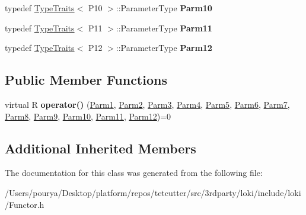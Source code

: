 \begin{DoxyCompactItemize}
\item 
\hypertarget{classLoki_1_1FunctorImpl_3_01R_00_01_01_01_01_01_01_01_01_01_01_01_01_01_01_01_01_01_01_01_01_011f98edb36b5671b9f4e136a08a7d1f1d_af65b1bc2c2b70f61a08b503c8c55f8a4}{}typedef \hyperlink{classLoki_1_1TypeTraits}{Type\+Traits}$<$ P10 $>$\+::Parameter\+Type {\bfseries Parm10}\label{classLoki_1_1FunctorImpl_3_01R_00_01_01_01_01_01_01_01_01_01_01_01_01_01_01_01_01_01_01_01_01_011f98edb36b5671b9f4e136a08a7d1f1d_af65b1bc2c2b70f61a08b503c8c55f8a4}

\item 
\hypertarget{classLoki_1_1FunctorImpl_3_01R_00_01_01_01_01_01_01_01_01_01_01_01_01_01_01_01_01_01_01_01_01_011f98edb36b5671b9f4e136a08a7d1f1d_ae864f67466a74e3e92ac958ff8b3e956}{}typedef \hyperlink{classLoki_1_1TypeTraits}{Type\+Traits}$<$ P11 $>$\+::Parameter\+Type {\bfseries Parm11}\label{classLoki_1_1FunctorImpl_3_01R_00_01_01_01_01_01_01_01_01_01_01_01_01_01_01_01_01_01_01_01_01_011f98edb36b5671b9f4e136a08a7d1f1d_ae864f67466a74e3e92ac958ff8b3e956}

\item 
\hypertarget{classLoki_1_1FunctorImpl_3_01R_00_01_01_01_01_01_01_01_01_01_01_01_01_01_01_01_01_01_01_01_01_011f98edb36b5671b9f4e136a08a7d1f1d_add912ee34bd3723e721b98922337af6e}{}typedef \hyperlink{classLoki_1_1TypeTraits}{Type\+Traits}$<$ P12 $>$\+::Parameter\+Type {\bfseries Parm12}\label{classLoki_1_1FunctorImpl_3_01R_00_01_01_01_01_01_01_01_01_01_01_01_01_01_01_01_01_01_01_01_01_011f98edb36b5671b9f4e136a08a7d1f1d_add912ee34bd3723e721b98922337af6e}

\end{DoxyCompactItemize}
\subsection*{Public Member Functions}
\begin{DoxyCompactItemize}
\item 
\hypertarget{classLoki_1_1FunctorImpl_3_01R_00_01_01_01_01_01_01_01_01_01_01_01_01_01_01_01_01_01_01_01_01_011f98edb36b5671b9f4e136a08a7d1f1d_a3888b8beace4c74d2bf82a4dfd598fc5}{}virtual R {\bfseries operator()} (\hyperlink{classLoki_1_1EmptyType}{Parm1}, \hyperlink{classLoki_1_1EmptyType}{Parm2}, \hyperlink{classLoki_1_1EmptyType}{Parm3}, \hyperlink{classLoki_1_1EmptyType}{Parm4}, \hyperlink{classLoki_1_1EmptyType}{Parm5}, \hyperlink{classLoki_1_1EmptyType}{Parm6}, \hyperlink{classLoki_1_1EmptyType}{Parm7}, \hyperlink{classLoki_1_1EmptyType}{Parm8}, \hyperlink{classLoki_1_1EmptyType}{Parm9}, \hyperlink{classLoki_1_1EmptyType}{Parm10}, \hyperlink{classLoki_1_1EmptyType}{Parm11}, \hyperlink{classLoki_1_1EmptyType}{Parm12})=0\label{classLoki_1_1FunctorImpl_3_01R_00_01_01_01_01_01_01_01_01_01_01_01_01_01_01_01_01_01_01_01_01_011f98edb36b5671b9f4e136a08a7d1f1d_a3888b8beace4c74d2bf82a4dfd598fc5}

\end{DoxyCompactItemize}
\subsection*{Additional Inherited Members}


The documentation for this class was generated from the following file\+:\begin{DoxyCompactItemize}
\item 
/\+Users/pourya/\+Desktop/platform/repos/tetcutter/src/3rdparty/loki/include/loki/Functor.\+h\end{DoxyCompactItemize}
